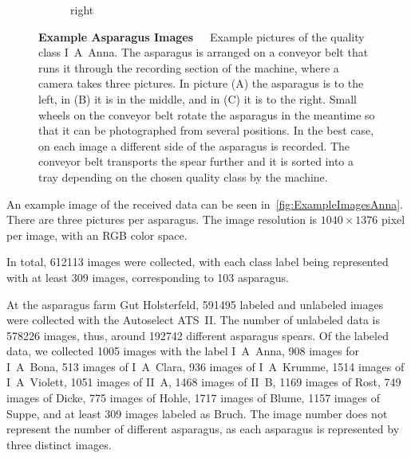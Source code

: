 \begin{figure}[h]
\begin{subfigure}{0.3\textwidth}
		\caption{right}
	\end{subfigure}
    \caption[Example Asparagus Images]{\textbf{Example Asparagus Images}~~~Example pictures of the quality class I~A~Anna. The asparagus is arranged on a conveyor belt that runs it through the recording section of the machine, where a camera takes three pictures. In picture (A) the asparagus is to the left, in (B) it is in the middle, and in (C) it is to the right. Small wheels on the conveyor belt rotate the asparagus in the meantime so that it can be photographed from several positions. In the best case, on each image a different side of the asparagus is recorded. The conveyor belt transports the spear further and it is sorted into a tray depending on the chosen quality class by the machine. 
}
    \label{fig:ExampleImagesAnna}
\end{figure}

\bigskip
An example image of the received data can be seen in~\autoref{fig:ExampleImagesAnna}. There are three pictures per asparagus. The image resolution is $1040\times1376$ pixel per image, with an RGB color space.

In total, 612113 images were collected, with each class label being represented with at least 309 images, corresponding to 103 asparagus.

At the asparagus farm Gut Holsterfeld, 591495 labeled and unlabeled images were collected with the Autoselect ATS~II. The number of unlabeled data is 578226 images, thus, around 192742 different asparagus spears. Of the labeled data, we collected 1005 images with the label I~A~Anna,  908 images for I~A~Bona, 513 images of I~A~Clara, 936 images of I~A~Krumme, 1514 images of I~A~Violett, 1051 images of II~A, 1468 images of II~B, 1169 images of Rost, 749 images of Dicke, 775 images of Hohle, 1717 images of Blume, 1157 images of Suppe, and at least 309 images labeled as Bruch. The image number does not represent the number of different asparagus, as each asparagus is represented by three distinct images.

